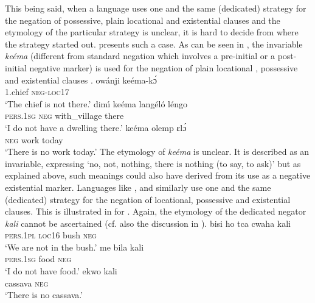 \documentclass[output=paper]{langsci/langscibook}
\begin{document}
This being said, when a language uses one and the same (dedicated) strategy
for the negation of possessive, plain locational and existential clauses
and the etymology of the particular strategy is unclear, it is hard to
decide from where the strategy started out.  presents such a
case. As can be seen in , the invariable \textit{ke{\'e}ma} (different from standard
negation which involves a pre-initial or a post-initial negative marker) is
used for the negation of plain locational , possessive
 and existential clauses .
\ea\label{ex:tetela-chief-dwelling-work}
\ea\label{ex:tetela-chief} \gll ow{\'a}nji ke{\'e}ma-k{\'ɔ}\\ 1.chief
\textsc{neg-loc}17\\ 
\glt 	`The chief is not there.'
%
\ex\label{ex:tetela-dwelling} 
\gll dim{\'\i} ke{\'e}ma lang{\'e}l{\'o} l{\'e}ngo\\ 
\textsc{pers.1sg} \textsc{neg} with\_village there\\ \glt 	`I
do not have a dwelling there.' \ex\label{ex:tetela-work} \gll ke{\'e}ma
olemp ɛl{\'ɔ}\\ \textsc{neg} work today\\ \glt 	`There is no work today.'
\z\z The etymology of \textit{ke{\'e}ma} is unclear. It is described as an
invariable, expressing `no, not, nothing, there is nothing (to say, to
ask)' \citep[155]{Hagendorens1957} but as explained above, such meanings
could also have derived from its use as a negative existential marker.
Languages like ,  and  similarly use one
and the same (dedicated) strategy for the negation of locational,
possessive and existential clauses. This is illustrated in
 for . Again, the etymology of
the dedicated negator \textit{kali} cannot be ascertained (cf. also the
discussion in ).
%
\ea\label{ex:mbete-bush-food-cassava}  
\ea\gll bisi ho {tca cwaha} kali\\ \textsc{pers.1pl}
\textsc{loc}16 bush \textsc{neg}\\ 
\glt `We are not in the bush.'
\ex\gll me bila kali\\ 
\textsc{pers.1sg} food \textsc{neg}\\ 
\glt 	`I do not have food.' 
\ex\gll ekwo kali\\ cassava \textsc{neg}\\ 
\glt `There is no cassava.' \z\z
\end{document}
